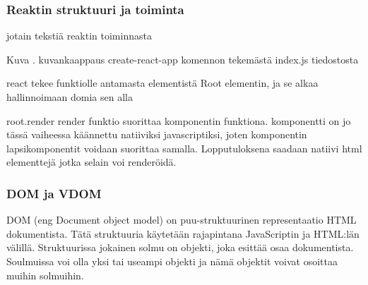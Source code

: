 \medskip

\subsubsection{Reaktin struktuuri ja toiminta}





jotain tekstiä reaktin toiminnasta 
\bigskip



Kuva \getImgCount{}. kuvankaappaus create-react-app komennon tekemästä index.js tiedostosta
\medskip

react tekee funktiolle antamasta elementistä Root elementin, ja se alkaa hallinnoimaan domia sen alla
\medskip


root.render
render funktio suorittaa komponentin funktiona. komponentti on jo tässä vaiheessa käännettu natiiviksi javascriptiksi, 
joten komponentin lapsikomponentit voidaan suorittaa samalla. Lopputuloksena saadaan natiivi html elementtejä jotka selain voi renderöidä.

\medskip



\subsubsection{DOM ja VDOM}





DOM (eng Document object model) on puu-struktuurinen representaatio HTML dokumentista.
Tätä struktuuria käytetään rajapintana JavaScriptin ja HTML:län välillä. 
Struktuurissa jokainen solmu on objekti, joka esittää osaa dokumentista. 
Soulmuissa voi olla yksi tai useampi objekti ja nämä objektit voivat osoittaa muihin solmuihin.




